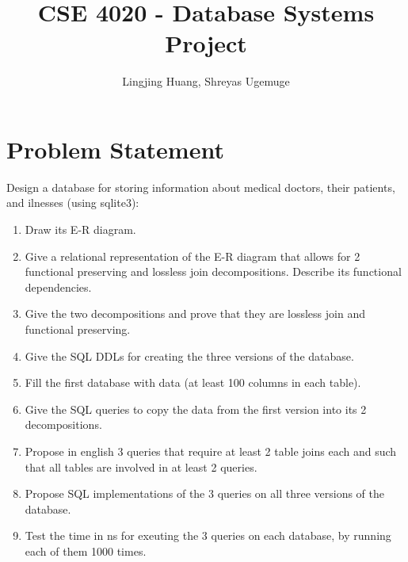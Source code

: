 \documentclass[12pt,arial]{article}
\title{CSE 4020 - Database Systems Project}
\author{Lingjing Huang, Shreyas Ugemuge}
\begin{document}
\maketitle
\tableofcontents
\pagebreak
\section*{Problem Statement}
Design a database for storing information about medical doctors, their patients, and ilnesses (using sqlite3):
\begin{enumerate}
	\item Draw its E-R diagram.
	\item Give a relational representation of the E-R diagram that allows for 2 functional preserving and lossless join decompositions. Describe its functional dependencies.
	\item Give the two decompositions and prove that they are lossless join and functional preserving.
	\item Give the SQL DDLs for creating the three versions of the database.
	\item Fill the first database with data (at least 100 columns in each table).
	\item Give the SQL queries to copy the data from the first version into its 2 decompositions.
	\item Propose in english 3 queries that require at least 2 table joins each and such that all tables are involved in at least 2 queries.
	\item Propose SQL implementations of the 3 queries on all three versions of the database.
	\item Test the time in ns for exeuting the 3 queries on each database, by running each of them 1000 times.
\end{enumerate}
\pagebreak
\end{document}
